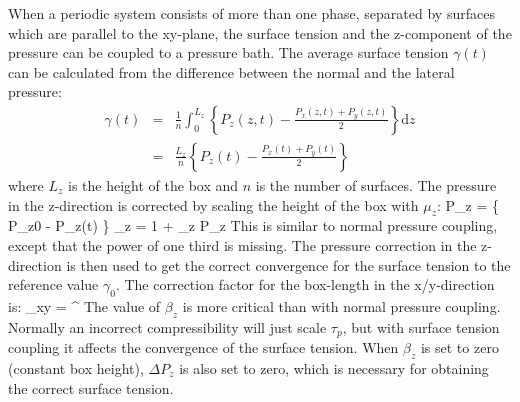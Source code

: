 \subsubsection*{}
When a periodic system consists of more than one phase, separated by
surfaces which are parallel to the xy-plane,
the surface tension and the z-component of the pressure can be coupled
to a pressure bath.
The average surface tension $\gamma(t)$ can be calculated from
the difference between the normal and the lateral pressure:
\begin{eqnarray}
\gamma(t) & = & 
\frac{1}{n} \int_0^{L_z}
\left\{ P_z(z,t) - \frac{P_x(z,t) + P_y(z,t)}{2} \right\} \mbox{d}z \\
& = &
\frac{L_z}{n} \left\{ P_z(t) - \frac{P_x(t) + P_y(t)}{2} \right\}
\end{eqnarray}
where $L_z$ is the height of the box and $n$ is the number of surfaces.
The pressure in the z-direction is corrected by scaling the height of
the box with $\mu_z$:
\beq
\Delta P_z =  \{ P_{z0} - P_z(t) \}
\eeq
\beq
\mu_z = 1 + \beta_z \Delta P_z
\eeq
This is similar to normal pressure coupling, except that the power
of one third is missing. 
The pressure correction in the z-direction is then used to get the
correct convergence for the surface tension to the reference value $\gamma_0$.
The correction factor for the box-length in the x/y-direction is:
\beq
\mu_{xy} = ^
\eeq
The value of $\beta_z$ is more critical than with normal pressure
coupling. Normally an incorrect compressibility will just scale $\tau_p$,
but with surface tension coupling it affects the convergence of the surface
tension. 
When $\beta_z$ is set to zero (constant box height), $\Delta P_z$ is also set
to zero, which is necessary for obtaining the correct surface tension. 

